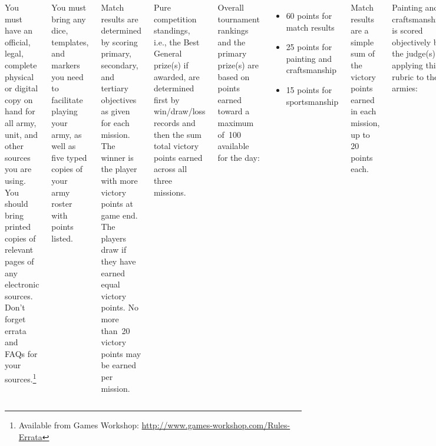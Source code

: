 \documentclass{40k}
\begin{document}
\begin{columns}

You must have an official, legal, complete physical or digital copy on
hand for all army, unit, and other sources you are using.  You should
bring printed copies of relevant pages of any electronic sources.
Don't forget errata and FAQs for your sources.\footnote{Available from
  Games Workshop:
  \url{http://www.games-workshop.com/Rules-Errata}}

You must bring any dice, templates, and markers you need to facilitate
playing your army, as well as five typed copies of your army roster
with points listed.


%

Match results are determined by scoring primary, secondary, and
tertiary objectives as given for each mission.  The winner is the
player with more victory points at game end.  The players draw if they
have earned equal victory points.  No more than~20 victory points may
be earned per mission.

Pure competition standings, i.e., the Best General prize(s) if
awarded, are determined first by win/draw/loss records and then the
sum total victory points earned across all three missions.

Overall tournament rankings and the primary prize(s) are based on
points earned toward a maximum of~100 available for the day:
\begin{itemize}\shortlist
\item 60 points for match results
\item 25 points for painting and craftsmanship
\item 15 points for sportsmanship
\end{itemize}

Match results are a simple sum of the victory points earned in each
mission, up to 20 points each.

Painting and craftsmanship is scored objectively by the judge(s)
applying this rubric to the armies:

\begin{itemize}\shortlist
\item All models assembled and primed: +5 pts
\item All models three-color minimum: +5 pts
\item All models based (paint/flock): +5 pts
\item Advanced painting techniques present (washes, drybrushing, etc): +5 pts
\item Advanced basing techniques present: +5 pts
\end{itemize}


\end{columns}
\end{document}
